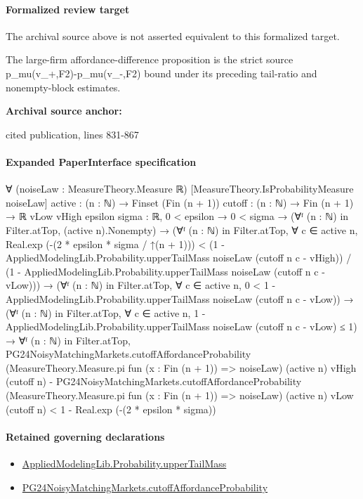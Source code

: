 \documentclass[10pt]{article}
\begin{document}
\paragraph{Formalized review target}
The archival source above is not asserted equivalent to this formalized target.
\begin{ReviewVerbatim}
The large-firm affordance-difference proposition is the strict source p_mu(v_+,F2)-p_mu(v_-,F2) bound under its preceding tail-ratio and nonempty-block estimates.
\end{ReviewVerbatim}

\textbf{Archival source anchor:} {\footnotesize\raggedright cited publication, lines 831-\allowbreak{}867\par}
\paragraph{Expanded PaperInterface specification}
\begin{ReviewVerbatim}
∀ (noiseLaw : MeasureTheory.Measure ℝ) [MeasureTheory.IsProbabilityMeasure noiseLaw]
  {active : (n : ℕ) → Finset (Fin (n + 1))} {cutoff : (n : ℕ) → Fin (n + 1) → ℝ} {vLow vHigh epsilon sigma : ℝ},
  0 < epsilon →
    0 < sigma →
      (∀ᶠ (n : ℕ) in Filter.atTop, (active n).Nonempty) →
        (∀ᶠ (n : ℕ) in Filter.atTop,
            ∀ c ∈ active n,
              Real.exp (-(2 * epsilon * sigma / ↑(n + 1))) <
                (1 - AppliedModelingLib.Probability.upperTailMass noiseLaw (cutoff n c - vHigh)) /
                  (1 - AppliedModelingLib.Probability.upperTailMass noiseLaw (cutoff n c - vLow))) →
          (∀ᶠ (n : ℕ) in Filter.atTop,
              ∀ c ∈ active n, 0 < 1 - AppliedModelingLib.Probability.upperTailMass noiseLaw (cutoff n c - vLow)) →
            (∀ᶠ (n : ℕ) in Filter.atTop,
                ∀ c ∈ active n, 1 - AppliedModelingLib.Probability.upperTailMass noiseLaw (cutoff n c - vLow) ≤ 1) →
              ∀ᶠ (n : ℕ) in Filter.atTop,
                PG24NoisyMatchingMarkets.cutoffAffordanceProbability
                      (MeasureTheory.Measure.pi fun (x : Fin (n + 1)) => noiseLaw) (active n) vHigh (cutoff n) -
                    PG24NoisyMatchingMarkets.cutoffAffordanceProbability
                      (MeasureTheory.Measure.pi fun (x : Fin (n + 1)) => noiseLaw) (active n) vLow (cutoff n) <
                  1 - Real.exp (-(2 * epsilon * sigma))
\end{ReviewVerbatim}

\paragraph{Retained governing declarations}
\begin{itemize}\raggedright
\item \hyperlink{governing-declaration-f983ca9c59dc317f}{Applied\allowbreak{}Modeling\allowbreak{}Lib.\allowbreak{}Probability.\allowbreak{}upper\allowbreak{}Tail\allowbreak{}Mass}
\item \hyperlink{governing-declaration-a4a2a08d89f647e4}{PG24\allowbreak{}Noisy\allowbreak{}Matching\allowbreak{}Markets.\allowbreak{}cutoff\allowbreak{}Affordance\allowbreak{}Probability}
\end{itemize}
\end{document}
